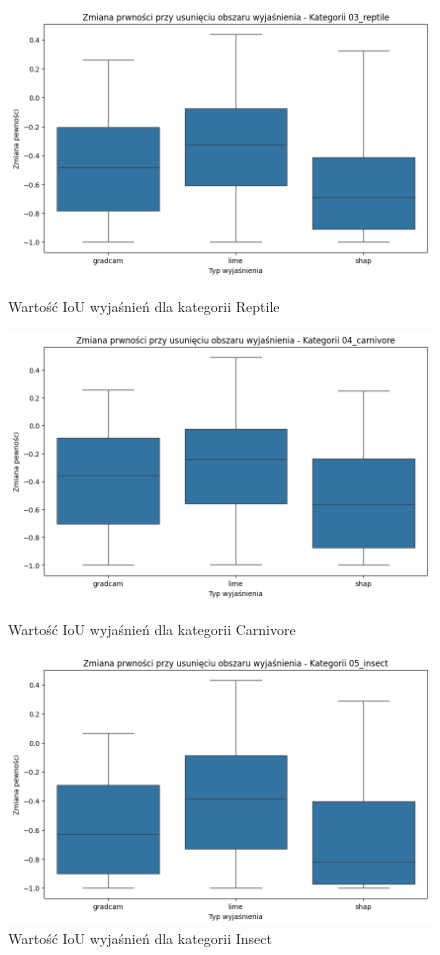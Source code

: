 \begin{figure}
	\centering
	\begin{minipage}[b]{0.3\textwidth}
		\centering\includegraphics[width=.9\textwidth]{img/base_confidence_mask_reptile}
		\caption{Wartość IoU wyjaśnień dla kategorii Reptile}  \label{rys:base_confidence_mask_reptile}
	\end{minipage}
	\begin{minipage}[b]{0.3\textwidth}
		\centering\includegraphics[width=.9\textwidth]{img/base_confidence_mask_carnivore}
		\caption{Wartość IoU wyjaśnień dla kategorii Carnivore}  \label{rys:base_confidence_mask_carnivore}
	\end{minipage}
	\begin{minipage}[b]{0.3\textwidth}
		\centering\includegraphics[width=.9\textwidth]{img/base_confidence_mask_insect}
		\caption{Wartość IoU wyjaśnień dla kategorii Insect}  \label{rys:base_confidence_mask_insect}
	\end{minipage}
\end{figure}
